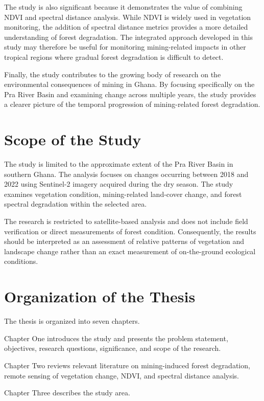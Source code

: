 \documentclass[a4paper,12pt]{report}
\begin{document}
The study is also significant because it demonstrates the value of combining NDVI and spectral distance analysis. While NDVI is widely used in vegetation monitoring, the addition of spectral distance metrics provides a more detailed understanding of forest degradation. The integrated approach developed in this study may therefore be useful for monitoring mining-related impacts in other tropical regions where gradual forest degradation is difficult to detect.

Finally, the study contributes to the growing body of research on the environmental consequences of mining in Ghana. By focusing specifically on the Pra River Basin and examining change across multiple years, the study provides a clearer picture of the temporal progression of mining-related forest degradation.

\section{Scope of the Study}

The study is limited to the approximate extent of the Pra River Basin in southern Ghana. The analysis focuses on changes occurring between 2018 and 2022 using Sentinel-2 imagery acquired during the dry season. The study examines vegetation condition, mining-related land-cover change, and forest spectral degradation within the selected area.

The research is restricted to satellite-based analysis and does not include field verification or direct measurements of forest condition. Consequently, the results should be interpreted as an assessment of relative patterns of vegetation and landscape change rather than an exact measurement of on-the-ground ecological conditions.

\section{Organization of the Thesis}

The thesis is organized into seven chapters.

Chapter One introduces the study and presents the problem statement, objectives, research questions, significance, and scope of the research.

Chapter Two reviews relevant literature on mining-induced forest degradation, remote sensing of vegetation change, NDVI, and spectral distance analysis.

Chapter Three describes the study area.
\end{document}
